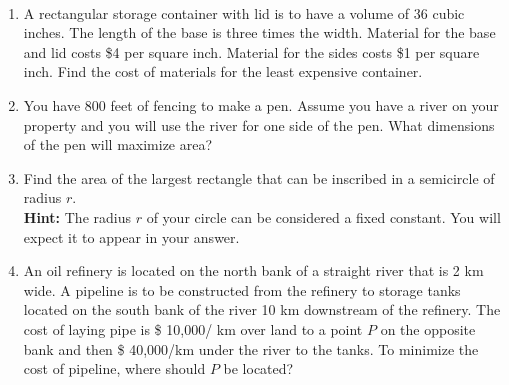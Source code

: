 \documentclass[11pt,fleqn]{article}
\begin{document}
\vspace*{-0.7in}

\begin{center}
  \Large{}\\
\end{center}
\begin{enumerate}
\item A rectangular storage container with lid is to have a volume of 36 cubic inches. The length of the base is three times the width. Material for the base and lid costs \$4 per square inch. Material for the sides costs \$1 per square inch. Find the cost of materials for the least expensive container.
\vfill
\item You have 800 feet of fencing to make a pen. Assume you have a river on your property and you will use the river for one side of the pen. What dimensions of the pen will maximize area?
\vfill
\newpage
\item Find the area of the largest rectangle that can
  be inscribed in a semicircle of radius $r$.\\ \textbf{Hint:} The radius $r$ of your circle can be considered a fixed constant. You will expect it to appear in your answer. 
  \vfill
\item An oil refinery is located on the north bank of a
straight river that is 2 km wide. A pipeline is to be constructed from
the refinery to storage tanks located on the south bank of the river 10
km downstream of the refinery. The cost of laying pipe is \$ 10,000/
km over land to a point $P$ on the opposite bank and then \$ 40,000/km
under the river to the tanks. To minimize the cost of pipeline, where
should $P$ be located? 
\vfill

\end{enumerate}
\end{document}
